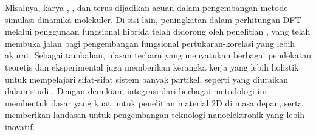 Misalnya, karya \cite{Allen1989}, \cite{Rapaport2004}, dan \cite{Allen1989} terus dijadikan acuan dalam pengembangan metode simulasi dinamika molekuler.
Di sisi lain, peningkatan dalam perhitungan DFT melalui penggunaan fungsional hibrida telah didorong oleh penelitian \cite{Becke1993}, yang telah membuka jalan bagi pengembangan fungsional pertukaran-korelasi yang lebih akurat.
Sebagai tambahan, ulasan terbaru yang menyatukan berbagai pendekatan teoretis dan eksperimental juga memberikan kerangka kerja yang lebih holistik untuk mempelajari sifat-sifat sistem banyak partikel, seperti yang diuraikan dalam studi \cite{Lele2022}.
Dengan demikian, integrasi dari berbagai metodologi ini membentuk dasar yang kuat untuk penelitian material 2D di masa depan, serta memberikan landasan untuk pengembangan teknologi nanoelektronik yang lebih inovatif.
